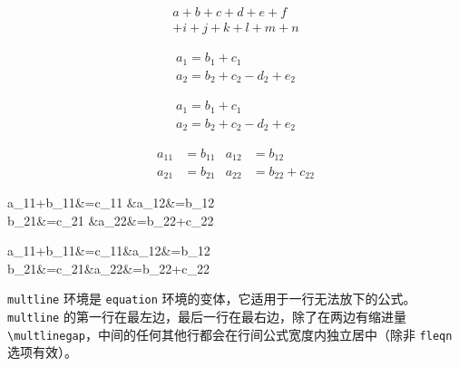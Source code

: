 \documentclass[openany]{ctexbook}
\begin{document}
\begin{listing}
\begin{multline}
a+b+c+d+e+f\\
+i+j+k+l+m+n
\end{multline}
\end{listing}

\begin{listing}

\begin{gather}
a_1=b_1+c_1\\
a_2=b_2+c_2-d_2+e_2
\end{gather}

\end{listing}



\begin{listing}

\begin{align}
a_1=b_1+c_1\\
a_2=b_2+c_2-d_2+e_2
\end{align}

\end{listing}



\begin{listing}

\begin{align}
a_{11}&=b_{11}&a_{12}&=b_{12}\\
a_{21}&=b_{21}&a_{22}&=b_{22}+c_{22}
\end{align}

\end{listing}



\begin{listing}

\begin{flalign*}
a_{11}+b_{11}&=c_{11}
&a_{12}&=b_{12}\\
b_{21}&=c_{21}
&a_{22}&=b_{22}+c_{22}
\end{flalign*}

\end{listing}

\begin{listing}
\begin{flalign}
a_{11}+b_{11}&=c_{11}&a_{12}&=b_{12}\\
b_{21}&=c_{21}&a_{22}&=b_{22}+c_{22}
\end{flalign}
\end{listing}

\verb|multline| 环境是 \verb|equation| 环境的变体，它适用于一行无法放下的公式。\verb|multline| 的第一行在最左边，最后一行在最右边，除了在两边有缩进量 \verb|\multlinegap|，中间的任何其他行都会在行间公式宽度内独立居中（除非 \verb|fleqn| 选项有效）。
\end{document}
